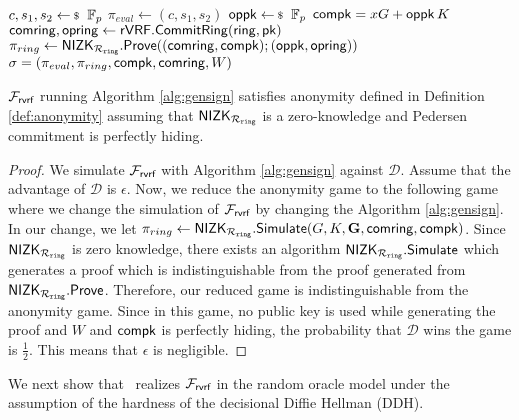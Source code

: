 \begin{algorithm}
	
	\caption{$\gen_{sign}(\ring,W,\{X,\pk\},\aux,\msg)$}
	\label{alg:gensign}	 	
	\begin{algorithmic}[1]
		\State $ c,s_1, s_2 \leftsample \FF_p $
		\State $ \pi_{eval}  \leftarrow (c,s_1, s_2)$
		\State $ \openpk \leftsample \FF_p $
		\State $ \mathsf{compk} =  x G + \mathsf{oppk} \, K$
		\State $ \mathsf{comring}, \mathsf{opring} \leftarrow {\ensuremath{\mathsf{rVRF}}}.{\mathsf{CommitRing}}(\mathsf{ring}, \mathsf{pk}) $
		\State $ \pi_{ring} \leftarrow {\ensuremath{\mathsf{NIZK}}}_{\mathcal{R}_{\mathtt{ring}}}.{\mathsf{Prove}}((\mathsf{comring}, \mathsf{compk}); (\mathsf{oppk}, \mathsf{opring})) $ 
		\State\Return$ \sigma = (\pi_{eval},\pi_{ring},\mathsf{compk},\mathsf{comring},W) $
	\end{algorithmic}
	
\end{algorithm}


\begin{lemma} \label{lem:anonymity} $ \mathcal{F}_{\textsf{rvrf}} $ running Algorithm \ref{alg:gensign} satisfies anonymity defined in Definition \ref{def:anonymity} assuming that $ {\mathsf{NIZK}}_{\mathcal{R}_{\mathtt{ring}}} $ is a zero-knowledge and Pedersen commitment is perfectly hiding.
\end{lemma}

\begin{proof}
	We simulate $ \mathcal{F}_{\textsf{rvrf}} $ with Algorithm \ref{alg:gensign} against $ \mathcal{D} $. Assume that the advantage of $ \mathcal{D} $ is $ \epsilon $. Now, we reduce the anonymity game to the following game where we change the simulation of $ \mathcal{F}_{\textsf{rvrf}} $ by changing the Algorithm \ref{alg:gensign}. In our change, we let $ \pi_{ring} \leftarrow {\ensuremath{\mathsf{NIZK}}}_{\mathcal{R}_{\mathtt{ring}}}.\mathsf{Simulate}(G,K,{\mathbf{G}},\mathsf{comring}, \mathsf{compk}) $. Since $ {\mathsf{NIZK}}_{\mathcal{R}_{\mathtt{ring}}} $ is zero knowledge, there exists an algorithm  $ {\mathsf{NIZK}}_{\mathcal{R}_{\mathtt{ring}}}.\mathsf{Simulate} $ which generates a proof which is indistinguishable from the proof generated from $ {\mathsf{NIZK}}_{\mathcal{R}_{\mathtt{ring}}}.{\mathsf{Prove}} $. Therefore, our reduced game is indistinguishable from the anonymity game. Since in this game, no public key is used while generating the proof and $ W $ and $ \mathsf{compk} $ is perfectly hiding, the probability that  $ \mathcal{D} $ wins the game is $ \frac{1}{2} $. This means that $ \epsilon $ is negligible.		
\end{proof}

We next show that \name \ realizes $ \mathcal{F}_{\textsf{rvrf}} $  in the random oracle model under the assumption of the hardness of the decisional Diffie Hellman (DDH).

